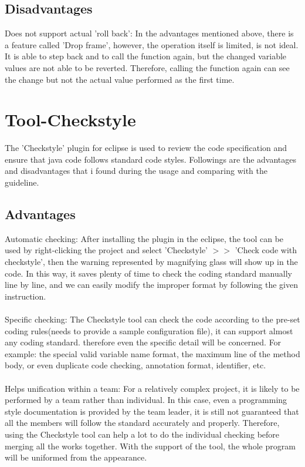 \documentclass[a4paper, 11pt]{article}
\begin{document}
\subsection{Disadvantages}
Does not support actual 'roll back': In the advantages mentioned above, there is a feature called 'Drop frame', however, the operation itself is limited, is not ideal. It is able to step back and to call the function again, but the changed variable values are not able to be reverted. Therefore, calling the function again can see the change but not the actual value performed as the first time. 

\section{Tool-Checkstyle}
The 'Checkstyle' plugin for eclipse is used to review the code specification and ensure that java code follows standard code styles. Followings are the advantages and disadvantages that i found during the usage and comparing with the guideline.

\subsection{Advantages}
Automatic checking: After installing the plugin in the eclipse, the tool can be used by right-clicking the project and select 'Checkstyle' $>>$ 'Check code with checkstyle', then the warning represented by magnifying glass will show up in the code. In this way, it saves plenty of time to check the coding standard manually line by line, and we can easily modify the improper format by following the given instruction.\\\\
\noindent
Specific checking: The Checkstyle tool can check the code according to the pre-set coding rules(needs to provide a sample configuration file), it can support almost any coding standard. therefore even the specific detail will be concerned. For example: the special valid variable name format, the maximum line of the method body, or even duplicate code checking, annotation format, identifier, etc.\\\\
\noindent
Helps unification within a team: For a relatively complex project, it is likely to be performed by a team rather than individual. In this case, even a programming style documentation is provided by the team leader, it is still not guaranteed that all the members will follow the standard accurately and properly. Therefore, using the Checkstyle tool can help a lot to do the individual checking before merging all the works together. With the support of the tool, the whole program will be uniformed from the appearance.
\end{document}
